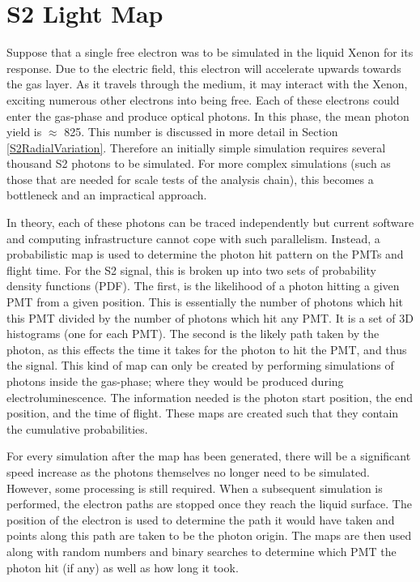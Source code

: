 \section{S2 Light Map}
\label{sec:s2lightmap}
\par
Suppose that a single free electron was to be simulated in the liquid Xenon for its response.
Due to the electric field, this electron will accelerate upwards towards the gas layer.
As it travels through the medium, it may interact with the Xenon, exciting numerous other electrons into being free.
Each of these electrons could enter the gas-phase and produce optical photons.
In this phase, the mean photon yield is $\approx$ 825.
This number is discussed in more detail in Section \ref{S2RadialVariation}.
Therefore an initially simple simulation requires several thousand S2 photons to be simulated.
For more complex simulations (such as those that are needed for scale tests of the analysis chain), this becomes a bottleneck and an impractical approach.

\par
In theory, each of these photons can be traced independently but current software and computing infrastructure cannot cope with such parallelism. 
Instead, a probabilistic map is used to determine the photon hit pattern on the PMTs and flight time.
For the S2 signal, this is broken up into two sets of probability density functions (PDF).
The first, is the likelihood of a photon hitting a given PMT from a given position.
This is essentially the number of photons which hit this PMT divided by the number of photons which hit any PMT.
It is a set of 3D histograms (one for each PMT).
The second is the likely path taken by the photon, as this effects the time it takes for the photon to hit the PMT, and thus the signal.
This kind of map can only be created by performing simulations of photons inside the gas-phase; where they would be produced during electroluminescence. 
The information needed is the photon start position, the end position, and the time of flight.
These maps are created such that they contain the cumulative probabilities.

\par
For every simulation after the map has been generated, there will be a significant speed increase as the photons themselves no longer need to be simulated.
However, some processing is still required.
When a subsequent simulation is performed, the electron paths are stopped once they reach the liquid surface.
The position of the electron is used to determine the path it would have taken and points along this path are taken to be the photon origin. %
The maps are then used along with random numbers and binary searches to determine which PMT the photon hit (if any) as well as how long it took.

